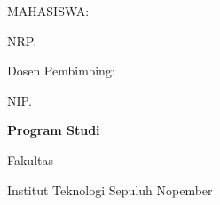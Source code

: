 {\rmfamily\fontsize{12}{15}\selectfont \coverdoctypename\par}

\vspace{2\baselineskip}
{\sffamily\bfseries\fontsize{18}{22}\selectfont\MakeUppercase{\internshiptitle}\par}

\vspace{5\baselineskip}
{\sffamily\fontsize{12}{15}\selectfont
  MAHASISWA:\par
  \MakeUppercase{\name}\par
  NRP. \nrp\par

  \vspace{3\baselineskip}
  Dosen Pembimbing:\par
  \advisor\par
  NIP. \advisornip\par}

\vspace{4\baselineskip}
{\rmfamily\bfseries\fontsize{14}{17}\selectfont
  Program Studi \studyprogram\par
  Fakultas \faculty\par
  Institut Teknologi Sepuluh Nopember\par
  \the\year\par}
